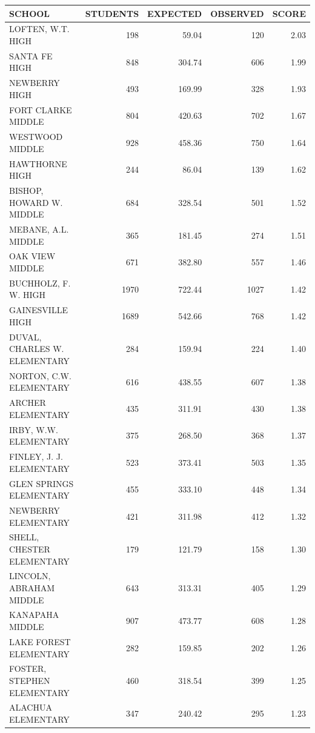 \begin{table}[H]
\begin{table}[ht]
\centering
{\tiny
\begin{tabular}{lrrrr}
  \hline
SCHOOL & STUDENTS & EXPECTED & OBSERVED & SCORE \\ 
  \hline
LOFTEN, W.T. HIGH  & 198 & 59.04 & 120 & 2.03 \\ 
  SANTA FE HIGH  & 848 & 304.74 & 606 & 1.99 \\ 
  NEWBERRY HIGH  & 493 & 169.99 & 328 & 1.93 \\ 
  FORT CLARKE MIDDLE  & 804 & 420.63 & 702 & 1.67 \\ 
  WESTWOOD MIDDLE  & 928 & 458.36 & 750 & 1.64 \\ 
  HAWTHORNE HIGH  & 244 & 86.04 & 139 & 1.62 \\ 
  BISHOP, HOWARD W. MIDDLE  & 684 & 328.54 & 501 & 1.52 \\ 
  MEBANE, A.L. MIDDLE  & 365 & 181.45 & 274 & 1.51 \\ 
  OAK VIEW MIDDLE  & 671 & 382.80 & 557 & 1.46 \\ 
  BUCHHOLZ, F. W. HIGH  & 1970 & 722.44 & 1027 & 1.42 \\ 
  GAINESVILLE HIGH  & 1689 & 542.66 & 768 & 1.42 \\ 
  DUVAL, CHARLES W. ELEMENTARY & 284 & 159.94 & 224 & 1.40 \\ 
  NORTON, C.W. ELEMENTARY & 616 & 438.55 & 607 & 1.38 \\ 
  ARCHER ELEMENTARY  & 435 & 311.91 & 430 & 1.38 \\ 
  IRBY, W.W. ELEMENTARY & 375 & 268.50 & 368 & 1.37 \\ 
  FINLEY, J. J. ELEMENTARY & 523 & 373.41 & 503 & 1.35 \\ 
  GLEN SPRINGS ELEMENTARY & 455 & 333.10 & 448 & 1.34 \\ 
  NEWBERRY ELEMENTARY & 421 & 311.98 & 412 & 1.32 \\ 
  SHELL, CHESTER ELEMENTARY & 179 & 121.79 & 158 & 1.30 \\ 
  LINCOLN, ABRAHAM MIDDLE  & 643 & 313.31 & 405 & 1.29 \\ 
  KANAPAHA MIDDLE  & 907 & 473.77 & 608 & 1.28 \\ 
  LAKE FOREST ELEMENTARY & 282 & 159.85 & 202 & 1.26 \\ 
  FOSTER, STEPHEN ELEMENTARY & 460 & 318.54 & 399 & 1.25 \\ 
  ALACHUA ELEMENTARY & 347 & 240.42 & 295 & 1.23 \\ 

\end{tabular}}
\end{table}
\end{table}
